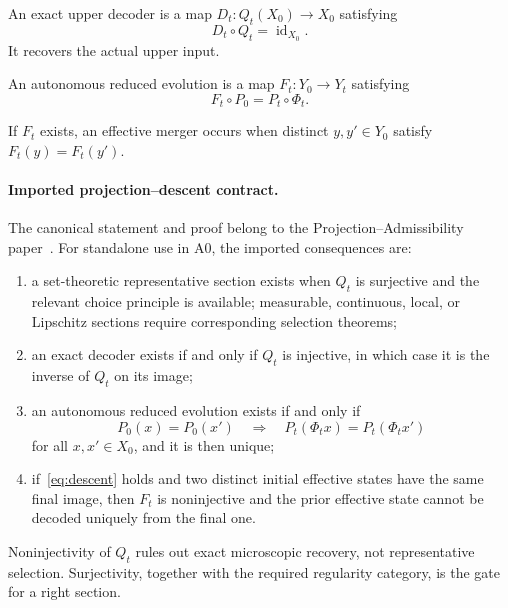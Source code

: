 \documentclass[11pt]{article}
\theoremstyle{plain}
\theoremstyle{plain}
\begin{document}
\begin{definition}
An exact upper decoder is a map $D_t:Q_t(X_0)\to X_0$ satisfying
\[
D_t\circ Q_t=\operatorname{id}_{X_0}.
\]
It recovers the actual upper input.
\end{definition}

\begin{definition}
An autonomous reduced evolution is a map $F_t:Y_0\to Y_t$ satisfying
\[
F_t\circ P_0=P_t\circ\Phi_t.
\]
\end{definition}

\begin{definition}
If $F_t$ exists, an effective merger occurs when distinct $y,y'\in Y_0$
satisfy $F_t(y)=F_t(y')$.
\end{definition}

\paragraph{Imported projection--descent contract.}
The canonical statement and proof belong to the
Projection--Admissibility paper~\cite{Nero2026_ProjectionAdmissibility_Principle}.
For standalone use in A0, the imported consequences are:
\begin{enumerate}
\item a set-theoretic representative section exists when $Q_t$ is surjective
and the relevant choice principle is available; measurable, continuous,
local, or Lipschitz sections require corresponding selection theorems;
\item an exact decoder exists if and only if $Q_t$ is injective, in which
case it is the inverse of $Q_t$ on its image;
\item an autonomous reduced evolution exists if and only if
\begin{equation}
P_0(x)=P_0(x')
\quad\Longrightarrow\quad
P_t(\Phi_t x)=P_t(\Phi_t x')
\label{eq:descent}
\end{equation}
for all $x,x'\in X_0$, and it is then unique;
\item if~\eqref{eq:descent} holds and two distinct initial effective states
have the same final image, then $F_t$ is noninjective and the prior effective
state cannot be decoded uniquely from the final one.
\end{enumerate}
Noninjectivity of $Q_t$ rules out exact microscopic recovery, not
representative selection.  Surjectivity, together with the required
regularity category, is the gate for a right section.
\end{document}
